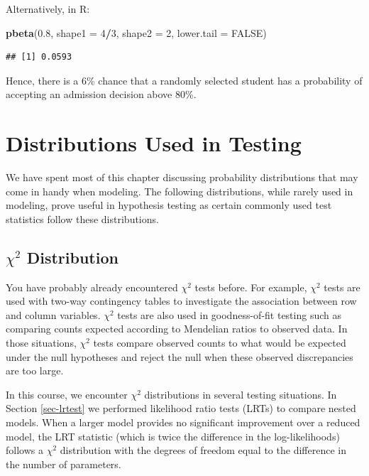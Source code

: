 \documentclass[
]{krantz}
\newenvironment{Shaded}{\begin{snugshade}}{\end{snugshade}}
\newcommand{\DataTypeTok}[1]{\textcolor[rgb]{0.27,0.27,0.27}{#1}}
\newcommand{\DecValTok}[1]{\textcolor[rgb]{0.06,0.06,0.06}{#1}}
\newcommand{\FloatTok}[1]{\textcolor[rgb]{0.06,0.06,0.06}{#1}}
\newcommand{\KeywordTok}[1]{\textcolor[rgb]{0.27,0.27,0.27}{\textbf{#1}}}
\newcommand{\NormalTok}[1]{#1}
\newcommand{\OperatorTok}[1]{\textcolor[rgb]{0.43,0.43,0.43}{\textbf{#1}}}
\newcommand{\OtherTok}[1]{\textcolor[rgb]{0.37,0.37,0.37}{#1}}
\begin{document}
Alternatively, in R:

\begin{Shaded}
\begin{Highlighting}[]
\KeywordTok{pbeta}\NormalTok{(}\FloatTok{0.8}\NormalTok{, }\DataTypeTok{shape1 =} \DecValTok{4}\OperatorTok{/}\DecValTok{3}\NormalTok{, }\DataTypeTok{shape2 =} \DecValTok{2}\NormalTok{, }\DataTypeTok{lower.tail =} \OtherTok{FALSE}\NormalTok{)}
\end{Highlighting}
\end{Shaded}

\begin{verbatim}
## [1] 0.0593
\end{verbatim}

Hence, there is a 6\% chance that a randomly selected student has a probability of accepting an admission decision above 80\%.

\hypertarget{distributions-used-in-testing}{%
\section{Distributions Used in Testing}\label{distributions-used-in-testing}}

We have spent most of this chapter discussing probability distributions that may come in handy when modeling. The following distributions, while rarely used in modeling, prove useful in hypothesis testing as certain commonly used test statistics follow these distributions.

\hypertarget{chi2-distribution}{%
\subsection{\texorpdfstring{\(\chi^2\) Distribution}{\textbackslash chi\^{}2 Distribution}}\label{chi2-distribution}}

You have probably already encountered \(\chi^2\) tests before. For example, \(\chi^2\) tests are used with two-way contingency tables to investigate the association between row and column variables. \(\chi^2\) tests are also used in goodness-of-fit testing such as comparing counts expected according to Mendelian ratios to observed data. In those situations, \(\chi^2\) tests compare observed counts to what would be expected under the null hypotheses and reject the null when these observed discrepancies are too large.

In this course, we encounter \(\chi^2\) distributions  in several testing situations. In Section \ref{sec-lrtest} we performed likelihood ratio tests (LRTs) to compare nested models. When a larger model provides no significant improvement over a reduced model, the LRT statistic (which is twice the difference in the log-likelihoods) follows a \(\chi^2\) distribution with the degrees of freedom equal to the difference in the number of parameters.
\end{document}
